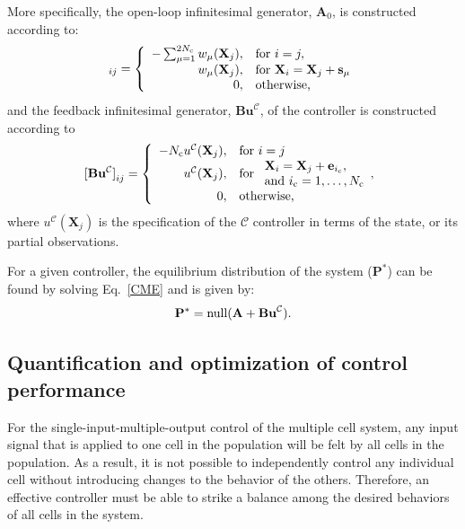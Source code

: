 \documentclass[12pt]{article}
\begin{document}
More specifically, the open-loop infinitesimal generator, $\mathbf{A}_0$, is constructed according to:
\begin{equation}
[\mathbf{A}_0]_{ij} = \left\{
\begin{array}{rl}
-\sum_{\mu =1}^{2N_{\rm c}} w_{\mu}(\mathbf{X}_j), &\text{for }i=j,\\
w_{\mu}(\mathbf{X}_j), &\text{for }\mathbf{X}_i = \mathbf{X}_j+\mathbf{s}_\mu\\
0, & \text{otherwise,}
\end{array}\right. 
\label{InfA}
\end{equation}
and the feedback infinitesimal generator, $\mathbf{Bu}^{\mathcal{C}}$, of the controller is constructed according to
\begin{equation}
[\mathbf{Bu^{\mathcal{C}}]}_{ij} = \left\{
\begin{array}{rl}
- N_{\rm c}{u}^{\mathcal{C}}(\mathbf{X}_j), &\text{for }i=j\\
{u}^{\mathcal{C}}(\mathbf{X}_j), &\text{for }\begin{array}{ll}\mathbf{X}_i =\mathbf{X}_j + \mathbf{e}_{i_{\rm c}}, \\ \text{and } i_{\rm c} = 1,\ldots,N_{\rm c}\end{array},\\
0, & \text{otherwise,}
\end{array}\right.
\label{InfB}
\end{equation}
where ${u}^{\mathcal{C}}(\mathbf{X}_j)$ is the specification of the $\mathcal{C}$ controller in terms of the state, or its partial observations.

For a given controller, the equilibrium distribution of the system ($\mathbf{P}^*$) can be found by solving Eq.\ \ref{CME} and is given by:
\begin{equation}
\mathbf{P}^*={\rm null}(\mathbf{A}+\textbf{Bu}^{\mathcal{C}}).\label{SSDist}
\end{equation}


\subsection{Quantification and optimization of control performance}

For the single-input-multiple-output control of the multiple cell system, any input signal that is applied to one cell in the population will be felt by all cells in the population. As a result, it is not possible to independently control any individual cell without introducing changes to the behavior of the others. Therefore, an effective controller must be able to strike a balance among the desired behaviors of all cells in the system.
\end{document}
